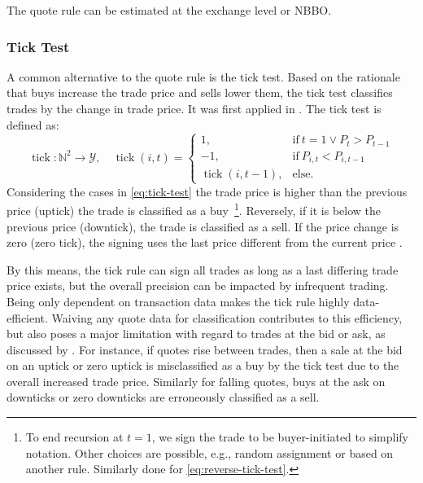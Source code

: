 The quote rule can be estimated at the exchange level or \gls{NBBO}.

\subsubsection{Tick Test}\label{sec:tick-test}


A common alternative to the quote rule is the tick test. Based on the rationale that buys increase the trade price and sells lower them, the tick test classifies trades by the change in trade price. It was first applied in \textcites[][244]{holthausenEffectLargeBlock1987}[][240]{hasbrouckTradesQuotesInventories1988}. The tick test is defined as:
\begin{equation}
    \operatorname{tick}\colon \mathbb{N}^2 \to \mathcal{Y},\quad
    \operatorname{tick}(i, t)=
    \begin{cases}
        1,                           & \mathrm{if}\ t=1 \lor P_{t}>P_{t-1} \\
        -1,                          & \mathrm{if}\ P_{i, t} < P_{i, t-1}  \\
        \operatorname{tick}(i, t-1), & \mathrm{else}.
    \end{cases}
    \label{eq:tick-test}
\end{equation}
Considering the cases in \cref{eq:tick-test} the trade price is higher than the previous price (uptick) the trade is classified as a buy~\footnote{To end recursion at $t=1$, we sign the trade to be buyer-initiated to simplify notation. Other choices are possible, e.g., random assignment or based on another rule. Similarly done for \cref{eq:reverse-tick-test}.}. Reversely, if it is below the previous price (downtick), the trade is classified as a sell. If the price change is zero (zero tick), the signing uses the last price different from the current price \autocite[][735]{leeInferringTradeDirection1991}.


By this means, the tick rule can sign all trades as long as a last differing trade price exists, but the overall precision can be impacted by infrequent trading. Being only dependent on transaction data makes the tick rule highly data-efficient. Waiving any quote data for classification contributes to this efficiency, but also poses a major limitation with regard to trades at the bid or ask, as discussed by \textcite[][557--558]{finucaneDirectTestMethods2000}. For instance, if quotes rise between trades, then a sale at the bid on an uptick or zero uptick is misclassified as a buy by the tick test due to the overall increased trade price. Similarly for falling quotes, buys at the ask on downticks or zero downticks are erroneously classified as a sell.


